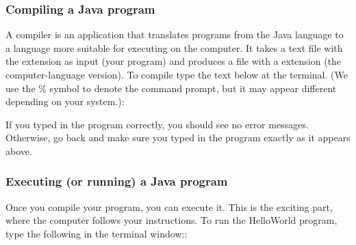 \documentclass[letterpaper,10pt,english,openany,oneside]{sphinxmanual}
\begin{document}
\begin{sphinxVerbatim}[commandchars=\\\{\}]
   
      \PYG{o}{[}\PYG{o}{]}  
\end{sphinxVerbatim}


\subsubsection{Compiling a Java program}
\label{\detokenize{introduction:compiling-a-java-program}}
A compiler is an application that translates programs from the Java language to a language more suitable for executing on the computer. It takes a text file with the  extension as input (your program) and produces a file with a  extension (the computer-language version). To compile  type the text below at the terminal. (We use the \% symbol to denote the command prompt, but it may appear different depending on your system.):

\begin{sphinxVerbatim}[commandchars=\\\{\}]
  
\end{sphinxVerbatim}

If you typed in the program correctly, you should see no error messages. Otherwise, go back and make sure you typed in the program exactly as it appears above.


\subsubsection{Executing (or running) a Java program}
\label{\detokenize{introduction:executing-or-running-a-java-program}}
Once you compile your program, you can execute it. This is the exciting part, where the computer follows your instructions. To run the HelloWorld program, type the following in the terminal window::

\begin{sphinxVerbatim}[commandchars=\\\{\}]
  
\end{sphinxVerbatim}
\end{document}
